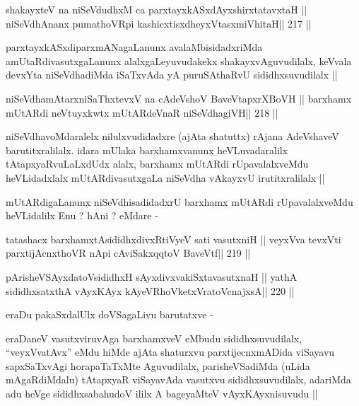 
\begin{shl}
shakayxteV na niSeVdudhxM ca parxtayxkASxdAyxshirxtatavxtaH ||
niSeVdhAnanx pumathoVR\s pi kashicxtisxdheyxVtasxmiVhitaH\hfill || 217 ||
\end{shl}

\begin{center}
parxtayxkASxdiparxmANagaLanunx avalaMbisidadxriMda
amUtaRdivasutxgaLanunx alalxgaLeyuvudakekx shakayxvAguvudilalx,
keVvala devxYta niSeVdhadiMda iSaTxvAda yA puruSAthaRvU
sididhxsuvudilalx ||
\end{center}

\begin{shl}
niSeVdhamAtarxniSaThxtevxV na cA\s\s deVshoV BaveVtapxrXBoVH ||
barxhamx mUtARdi neVtuyxkwtx mUtARdeVnaR niSeVdhagiVH\hfill || 218 ||
\end{shl}

\begin{artha}
niSeVdhavoMdaralelx nilulxvudidadxre (ajAta shatuttx) rAjana
AdeVshaveV barutitxralilalx. idara mUlaka barxhamxvanunx
heVLuvadaralilx tAtapxyaRvuLaLxdUdx alalx, barxhamx mUtARdi
rUpavalalxveMdu heVLidadxlalx mUtARdivasutxgaLa niSeVdha vAkayxvU
irutitxralilalx ||
\end{artha}

\begin{artha}
mUtARdigaLanunx niSeVdhisadidadxrU barxhamx mUtARdi rUpavalalxveMdu
heVLidalilx Enu ? hAni ? eMdare -
\end{artha}

\begin{shl}
tatashacx barxhamxtAsididhxdivxRtiVyeV sati vasutxniH ||
veyxVva tevxVti parxtijAcnxthoVR nApi cA\s\s viSakxqqtoV BaveVtf\hfill || 219 ||
\end{shl}

\begin{shl}
pArisheVSAyxdatoV\s sididhxH sAyxdivxvakiSxtavasutxnaH ||
yathA sididhxsatxthA vAyxKAyx kAyeVRhoVketxVratoV\s cnajxsA\hfill || 220 ||
\end{shl}

\begin{artha}
eraDu pakaSxdalUlx doVSagaLivu barutatxve -
\end{artha}

\begin{artha}
eraDaneV vasutxviruvAga barxhamxveV eMbudu sididhxsuvudilalx,
``veyxVvatAvx'' eMdu hiMde ajAta shaturxvu parxtijecnxmADida viSayavu
sapxSaTxvAgi horapaTaTxMte Aguvudilalx, parisheVSadiMda (uLida
mAgaRdiMdalu) tAtapxyaR viSayavAda vasutxvu sididhxsuvudilalx,
adariMda adu heVge sididhxsabahudoV ililx A bageyaMteV
vAyxKAyxnisuvudu ||
\end{artha}

